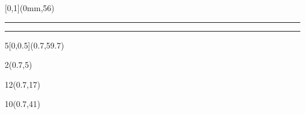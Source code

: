 \begin{frame}[plain]
  \begin{textblock*}{\paperwidth}[0,1](0mm,56\TPVertModule)
    \textcolor{rouge}{\rule{\banderougewidth}{\banderougeheight}}%
    \textcolor{bleu}{\rule{\bandeorwidth}{\bandeorheight}}
  \end{textblock*}

	\begin{textblock*}{5\TPHorizModule}[0,0.5](0.7\TPHorizModule,59.7\TPVertModule)
		\site
	\end{textblock*}

  \begin{textblock*}{2\TPHorizModule}(0.7\TPHorizModule,5\TPVertModule)
    \textcolor[rgb]{0.13,0.13,0.13}{\webinaire}
  \end{textblock*}


  \begin{textblock*}{12\TPHorizModule}(0.7\TPHorizModule,17\TPVertModule)
    \textcolor[rgb]{0.13,0.13,0.13}{\titlefmt}
  \end{textblock*}

  \begin{textblock*}{10\TPHorizModule}(0.7\TPHorizModule,41\TPVertModule)
    \textcolor[rgb]{0.13,0.13,0.13}{\datefmt}
  \end{textblock*}
\end{frame}
\endgroup
